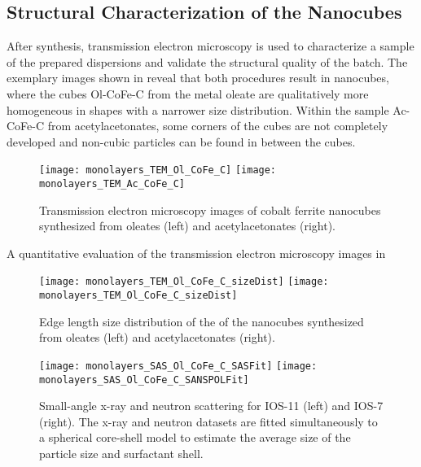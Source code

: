 \documentclass[\main/dresen_thesis.tex]{subfiles}
\begin{document}
  \subsection{Structural Characterization of the Nanocubes}
    After synthesis, transmission electron microscopy is used to characterize a sample of the prepared dispersions and validate the structural quality of the batch.
    The exemplary images shown in  reveal that both procedures result in nanocubes, where the cubes Ol-CoFe-C from the metal oleate are qualitatively more homogeneous in shapes with a narrower size distribution.
    Within the sample Ac-CoFe-C from acetylacetonates, some corners of the cubes are not completely developed and non-cubic particles can be found in between the cubes.

    \begin{figure}[tb]
      \centering
      \texttt{[image: monolayers\_TEM\_Ol\_CoFe\_C]}
      \texttt{[image: monolayers\_TEM\_Ac\_CoFe\_C]}
      \caption{\label{fig:monolayers:nanoparticle:tem}Transmission electron microscopy images of cobalt ferrite nanocubes synthesized from oleates (left) and acetylacetonates (right).}
    \end{figure}

    A quantitative evaluation of the transmission electron microscopy images in 
    \begin{figure}[tb]
      \centering
      \texttt{[image: monolayers\_TEM\_Ol\_CoFe\_C\_sizeDist]}
      \texttt{[image: monolayers\_TEM\_Ol\_CoFe\_C\_sizeDist]}
      \caption{\label{fig:monolayers:nanoparticle:tem:edgelengths}Edge length size distribution of the  of the nanocubes synthesized from oleates (left) and acetylacetonates (right).}
    \end{figure}

    \begin{figure}[tb]
      \centering
      \texttt{[image: monolayers\_SAS\_Ol\_CoFe\_C\_SASFit]}
      \texttt{[image: monolayers\_SAS\_Ol\_CoFe\_C\_SANSPOLFit]}
      \caption{\label{fig:monolayers:nanoparticle:sas}Small-angle x-ray and neutron scattering for IOS-11 (left) and IOS-7 (right). The x-ray and neutron datasets are fitted simultaneously to a spherical core-shell model to estimate the average size of the particle size and surfactant shell.}
    \end{figure}
\end{document}
